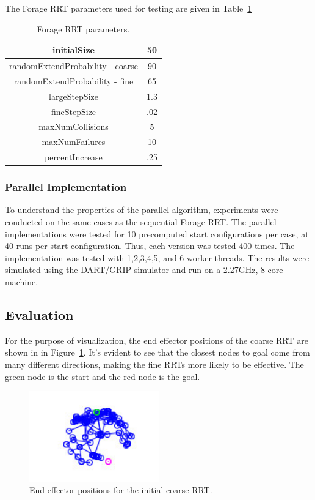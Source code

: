 \documentclass[conference]{IEEEtran}
\begin{document}
The Forage RRT parameters used for testing are given in Table~\ref{tab:ForageParams}

\begin{table}
	\centering
	\begin{tabular}{| c | c | }
        	\hline
		initialSize & 50 \\ \hline
  		randomExtendProbability - coarse & 90 \\ \hline
  		randomExtendProbability - fine & 65 \\ \hline
  		largeStepSize & 1.3\\ \hline
  		fineStepSize & .02\\ \hline
  		maxNumCollisions & 5\\ \hline
  		maxNumFailures & 10\\ \hline
		percentIncrease & .25\\ \hline 
	\end{tabular}
	\caption{Forage RRT parameters.} 
	\label{tab:ForageParams}
\end{table}

\subsubsection{Parallel Implementation}
To understand the properties of the parallel algorithm, experiments were conducted on the same cases as the sequential Forage RRT. The
parallel implementations were tested for 10 precomputed start configurations per case, at 40 runs per start configuration. Thus, each
version was tested 400 times. The implementation was tested with 1,2,3,4,5, and 6 worker threads. The results were simulated using the
DART/GRIP simulator and run on a 2.27GHz, 8 core machine.

\subsection{Evaluation}
For the purpose of visualization, the end effector positions of the coarse RRT are shown in in Figure~\ref{fig:CoarseRRT}. It's evident to
see that the closest nodes to goal come from many different directions, making the fine RRTs more likely to be effective. The green node is
the start and the red node is the goal.

\begin{figure}[h!]
  \centering
    \includegraphics[width=0.5\textwidth]{figures/coarseRRTExample.jpg}
  \caption{End effector positions for the initial coarse RRT. \label{fig:CoarseRRT} }
\end{figure}
\end{document}
